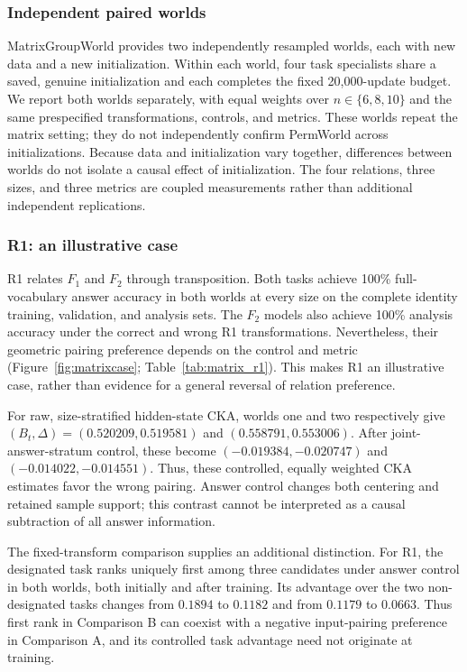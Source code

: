 \subsubsection{Independent paired worlds}

MatrixGroupWorld provides two independently resampled worlds, each with new data and a new initialization. Within each world, four task specialists share a saved, genuine initialization and each completes the fixed 20,000-update budget. We report both worlds separately, with equal weights over $n\in\{6,8,10\}$ and the same prespecified transformations, controls, and metrics. These worlds repeat the matrix setting; they do not independently confirm PermWorld across initializations. Because data and initialization vary together, differences between worlds do not isolate a causal effect of initialization. The four relations, three sizes, and three metrics are coupled measurements rather than additional independent replications.

\subsubsection{R1: an illustrative case}

R1 relates $F_1$ and $F_2$ through transposition. Both tasks achieve 100\% full-vocabulary answer accuracy in both worlds at every size on the complete identity training, validation, and analysis sets. The $F_2$ models also achieve 100\% analysis accuracy under the correct and wrong R1 transformations. Nevertheless, their geometric pairing preference depends on the control and metric (Figure~\ref{fig:matrixcase}; Table~\ref{tab:matrix_r1}). This makes R1 an illustrative case, rather than evidence for a general reversal of relation preference.

For raw, size-stratified hidden-state CKA, worlds one and two respectively give $(B_t,\Delta)=(0.520209,0.519581)$ and $(0.558791,0.553006)$. After joint-answer-stratum control, these become $(-0.019384,-0.020747)$ and $(-0.014022,-0.014551)$. Thus, these controlled, equally weighted CKA estimates favor the wrong pairing. Answer control changes both centering and retained sample support; this contrast cannot be interpreted as a causal subtraction of all answer information.

The fixed-transform comparison supplies an additional distinction. For R1,
the designated task ranks uniquely first among three candidates under answer
control in both worlds, both initially and after training. Its advantage over
the two non-designated tasks changes from $0.1894$ to $0.1182$ and from
$0.1179$ to $0.0663$. Thus first rank in Comparison B can coexist with a
negative input-pairing preference in Comparison A, and its controlled task
advantage need not originate at training.

